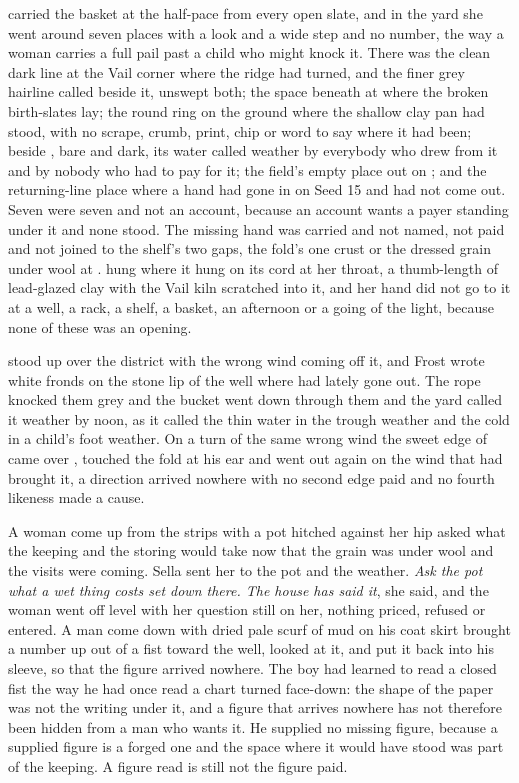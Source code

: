  carried the basket at the half-pace from every open slate, and in the yard she went around seven places with a look and a wide step and no number, the way a woman carries a full pail past a child who might knock it. There was the clean dark line at the Vail corner where the  ridge had turned, and the finer grey hairline called  beside it, unswept both; the space beneath  at  where the broken birth-slates lay; the round ring on the ground where the shallow clay pan had stood, with no scrape, crumb, print, chip or word to say where it had been;  beside , bare and dark, its water called weather by everybody who drew from it and by nobody who had to pay for it; the field's empty place out on ; and the returning-line place where a hand had gone in on Seed 15 and had not come out. Seven were seven and not an account, because an account wants a payer standing under it and none stood. The missing hand was carried and not named, not paid and not joined to the shelf's two gaps, the fold's one crust or the dressed grain under wool at .  hung where it hung on its cord at her throat, a thumb-length of lead-glazed clay with the Vail kiln scratched into it, and her hand did not go to it at a well, a rack, a shelf, a basket, an afternoon or a going of the light, because none of these was an opening.

 stood up over the district with the wrong wind coming off it, and Frost wrote white fronds on the stone lip of the well where  had lately gone out. The rope knocked them grey and the bucket went down through them and the yard called it weather by noon, as it called the thin water in the trough weather and the cold in a child's foot weather. On a turn of the same wrong wind the sweet edge of  came over , touched the fold at his ear and went out again on the wind that had brought it, a direction arrived nowhere with no second edge paid and no fourth likeness made a cause.

A woman come up from the strips with a pot hitched against her hip asked what the keeping and the storing would take now that the grain was under wool and the visits were coming. Sella sent her to the pot and the weather. \emph{Ask the pot what a wet thing costs set down there. The house has said it}, she said, and the woman went off level with her question still on her, nothing priced, refused or entered. A man come down  with dried pale scurf of mud on his coat skirt brought a number up out of a fist toward the well, looked at it, and put it back into his sleeve, so that the figure arrived nowhere. The boy had learned to read a closed fist the way he had once read a chart turned face-down: the shape of the paper was not the writing under it, and a figure that arrives nowhere has not therefore been hidden from a man who wants it. He supplied no missing figure, because a supplied figure is a forged one and the space where it would have stood was part of the keeping. A figure read is still not the figure paid.

